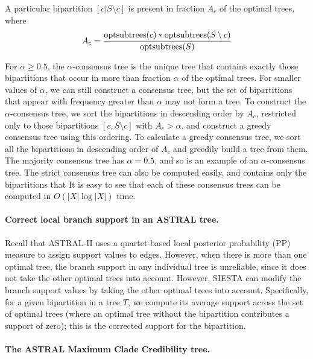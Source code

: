 A particular bipartition $[c|S \setminus c]$ is present in fraction $A_c$ of the optimal trees, where 
\begin{equation}
  A_c = \frac{\mathop{\rm optsubtrees}(c) * \mathop{\rm optsubtrees} (S\setminus c)}{\mathop{\rm optsubtrees}(S)}
\end{equation}
 

For $\alpha \geq 0.5$, the $\alpha$-consensus tree is the unique tree that contains exactly those bipartitions that occur in more than fraction $\alpha $ of the optimal trees.
For smaller values of $\alpha$, we can still construct a consensus tree, but the set of bipartitions that appear with frequency greater than $\alpha$ may not form a tree.
To construct the $\alpha$-consensus tree, we  sort the bipartitions in descending order by  $A_c$, restricted only to those bipartitions $[c,S\setminus c]$  with $A_c> \alpha$, and construct a greedy consensus tree using this ordering.   
To calculate a greedy consensus tree, we sort all the bipartitions in descending order of $A_c$ and greedily build a tree from them.
The majority consensus tree has $\alpha=0.5$, and so is an example of an $\alpha$-consensus tree.
The strict consensus tree can also be computed easily, and contains only the bipartitions that 
It is easy to see that each of these consensus trees can be computed in  $O(|X| \log |X|)$ time.

\paragraph{Correct local branch support in an ASTRAL tree. }

Recall that ASTRAL-II uses a quartet-based local posterior probability (PP) measure \cite{sayyari2016fast} to assign support values to edges.
However, when there is more than one optimal tree, the branch support in any individual tree is unreliable, since it does not take the other optimal trees into account.
However,  SIESTA can modify the branch support values by taking the other optimal trees into account. 
Specifically, for a given bipartition in a tree $T$,  we compute its average support across the set of optimal trees (where an optimal tree without the bipartition contributes a support of zero); this is the corrected support for the bipartition.


\paragraph{The ASTRAL Maximum Clade Credibility tree. }


